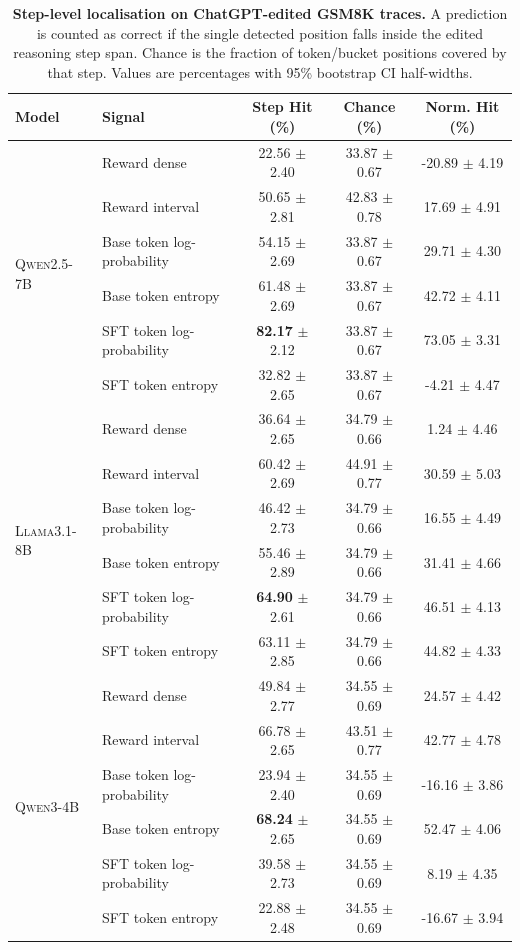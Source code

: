 \begin{table}[t]
\centering
\small
\setlength{\tabcolsep}{4pt}
\caption{\textbf{Step-level localisation on ChatGPT-edited GSM8K traces.} A prediction is counted as correct if the single detected position falls inside the edited reasoning step span. Chance is the fraction of token/bucket positions covered by that step. Values are percentages with 95\% bootstrap CI half-widths.}
\label{tab:localisation_chatgpt_step_step_hit}
\begin{tabular}{llccc}
\toprule
\textbf{Model} & \textbf{Signal} & \textbf{Step Hit (\%)} & \textbf{Chance (\%)} & \textbf{Norm. Hit (\%)} \\
\midrule
\multirow{6}{*}{\textsc{Qwen2.5-7B}} & Reward dense & 22.56 $\pm$ 2.40 & 33.87 $\pm$ 0.67 & -20.89 $\pm$ 4.19 \\
 & Reward interval & 50.65 $\pm$ 2.81 & 42.83 $\pm$ 0.78 & 17.69 $\pm$ 4.91 \\
 & Base token log-probability & 54.15 $\pm$ 2.69 & 33.87 $\pm$ 0.67 & 29.71 $\pm$ 4.30 \\
 & Base token entropy & 61.48 $\pm$ 2.69 & 33.87 $\pm$ 0.67 & 42.72 $\pm$ 4.11 \\
 & SFT token log-probability & \textbf{82.17} $\pm$ 2.12 & 33.87 $\pm$ 0.67 & 73.05 $\pm$ 3.31 \\
 & SFT token entropy & 32.82 $\pm$ 2.65 & 33.87 $\pm$ 0.67 & -4.21 $\pm$ 4.47 \\
\midrule
\multirow{6}{*}{\textsc{Llama3.1-8B}} & Reward dense & 36.64 $\pm$ 2.65 & 34.79 $\pm$ 0.66 & 1.24 $\pm$ 4.46 \\
 & Reward interval & 60.42 $\pm$ 2.69 & 44.91 $\pm$ 0.77 & 30.59 $\pm$ 5.03 \\
 & Base token log-probability & 46.42 $\pm$ 2.73 & 34.79 $\pm$ 0.66 & 16.55 $\pm$ 4.49 \\
 & Base token entropy & 55.46 $\pm$ 2.89 & 34.79 $\pm$ 0.66 & 31.41 $\pm$ 4.66 \\
 & SFT token log-probability & \textbf{64.90} $\pm$ 2.61 & 34.79 $\pm$ 0.66 & 46.51 $\pm$ 4.13 \\
 & SFT token entropy & 63.11 $\pm$ 2.85 & 34.79 $\pm$ 0.66 & 44.82 $\pm$ 4.33 \\
\midrule
\multirow{6}{*}{\textsc{Qwen3-4B}} & Reward dense & 49.84 $\pm$ 2.77 & 34.55 $\pm$ 0.69 & 24.57 $\pm$ 4.42 \\
 & Reward interval & 66.78 $\pm$ 2.65 & 43.51 $\pm$ 0.77 & 42.77 $\pm$ 4.78 \\
 & Base token log-probability & 23.94 $\pm$ 2.40 & 34.55 $\pm$ 0.69 & -16.16 $\pm$ 3.86 \\
 & Base token entropy & \textbf{68.24} $\pm$ 2.65 & 34.55 $\pm$ 0.69 & 52.47 $\pm$ 4.06 \\
 & SFT token log-probability & 39.58 $\pm$ 2.73 & 34.55 $\pm$ 0.69 & 8.19 $\pm$ 4.35 \\
 & SFT token entropy & 22.88 $\pm$ 2.48 & 34.55 $\pm$ 0.69 & -16.67 $\pm$ 3.94 \\
\bottomrule
\end{tabular}
\end{table}
